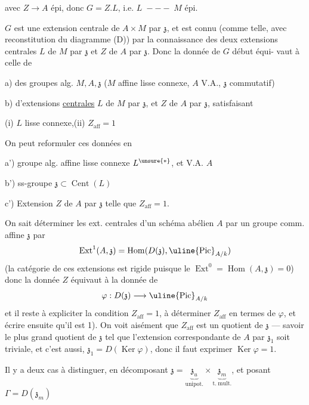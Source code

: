 avec $Z\longrightarrow A$ épi, donc $G=Z.L$, i.e. $L\;---\;M$ épi.

$G$ est une extension centrale de $A\times M$ par $\mathfrak z$, et est connu (comme
telle, avec reconstitution du diagramme (D)) par la connaissance
des deux extensions centrales $L$ de $M$ par $\mathfrak z$ et $Z$ de $A$ par $\mathfrak z$.
Donc la donnée de $G$   début équi-
vaut à celle de

a) des groupes alg. $M,A,\mathfrak z$ ($M$ affine lisse connexe, $A$ V.A., $\mathfrak z$  commutatif)

b) d'extensions \uline{centrales} $L$ de $M$ par $\mathfrak z$, et $Z$ de $A$ par $\mathfrak z$, satisfaisant

(i) $L$ lisse connexe,\quad (ii) $Z_{\mathrm{aff}}=1$

On peut reformuler ces données en

a') groupe alg. affine lisse connexe $L^{\unsure{*}}$, et V.A. $A$

b') ss-groupe  $\mathfrak z\subset\operatorname{Cent}(L)$

c') Extension   $Z$ de $A$ par $\mathfrak z$ telle que $Z_{\mathrm{aff}}=1$.

On sait déterminer les ext. centrales d'un schéma abélien $A$
par un groupe  comm. affine $\mathfrak z$ par
\[
\operatorname{Ext}^1(A,\mathfrak z)=\operatorname{Hom}(D(\mathfrak z),\uline{\operatorname{Pic}}_{A/k})
\]
(la catégorie de ces extensions est rigide puisque le
$\operatorname{Ext}^0=\operatorname{Hom}(A,\mathfrak z)=0$) donc la donnée   $Z$ équivaut à
la donnée de
\[\varphi:D(\mathfrak z)\longrightarrow\uline{\operatorname{Pic}}_{A/k}\]
et il reste à expliciter la condition $Z_{\mathrm{aff}}=1$,  
à déterminer $Z_{\mathrm{aff}}$ en termes de $\varphi$, et écrire ensuite qu'il est 1).
On voit  aisément que $Z_{\mathrm{aff}}$ est un quotient  de \deleted{\unsure{$\varphi$}} $\mathfrak z$
--- savoir le plus grand quotient de $\mathfrak z$ tel que l'extension
correspondante de $A$ par $\mathfrak z_1$  soit triviale, et c'est aussi,
$\mathfrak z_1=D(\operatorname{Ker}\varphi)$, donc il faut exprimer $\operatorname{Ker}\varphi=1$.

 Il y a deux cas à distinguer, en décomposant
$\mathfrak z=\underbrace{\mathfrak z_u}_{\mathrm{unipot.}}\times\underbrace{\mathfrak z_m}_{\mathrm{t.\ mult.}}$,
et posant $\Gamma=D(\mathfrak z_m)$

